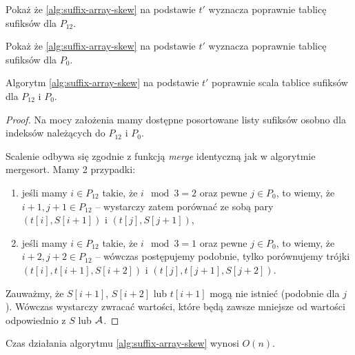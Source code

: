 \begin{code}
\inputminted{python}{code/suffix-array/skew.py}
\label{alg:suffix-array-skew}
\end{code}

\begin{problem}{}{}
  Pokaż że \ref{alg:suffix-array-skew} na podstawie $t'$ wyznacza poprawnie tablicę sufiksów dla $P_{12}$.
\end{problem}

\begin{problem}{}{}
  Pokaż że \ref{alg:suffix-array-skew} na podstawie $t'$ wyznacza poprawnie tablicę sufiksów dla $P_0$.
\end{problem}

\begin{theorem}{}{}
  Algorytm \ref{alg:suffix-array-skew} na podstawie $t'$ poprawnie scala tablice sufiksów dla $P_{12}$ i $P_0$.
\end{theorem}

\begin{proof}
  Na mocy założenia mamy dostępne posortowane listy sufiksów osobno dla indeksów należących do $P_{12}$ i $P_0$.
  
  Scalenie odbywa się zgodnie z funkcją \emph{merge} identyczną jak w algorytmie mergesort. Mamy 2 przypadki:
  \begin{enumerate}
    \item jeśli mamy $i \in P_{12}$ takie, że $i \mod 3 = 2$ oraz pewne $j \in P_0$, to wiemy, że $i + 1, j + 1 \in P_{12}$ -- wystarczy zatem porównać ze sobą pary $(t[i], S[i + 1])$ i $(t[j], S[j + 1])$,
    \item jeśli mamy $i \in P_{12}$ takie, że $i \mod 3 = 1$ oraz pewne $j \in P_0$, to wiemy, że $i + 2, j + 2 \in P_{12}$ -- wówczas postępujemy podobnie, tylko porównujemy trójki $(t[i], t[i + 1], S[i + 2])$ i $(t[j], t[j + 1], S[j + 2])$.
  \end{enumerate}
  Zauważmy, że $S[i + 1]$, $S[i + 2]$ lub $t[i + 1]$ mogą nie istnieć (podobnie dla $j$). Wówczas wystarczy zwracać wartości, które będą zawsze mniejsze od wartości odpowiednio z $S$ lub $\operatorname{\mathcal{A}}$.
\end{proof}

\begin{theorem}{}{}
  Czas działania algorytmu \ref{alg:suffix-array-skew} wynosi $O(n)$.
\end{theorem}



